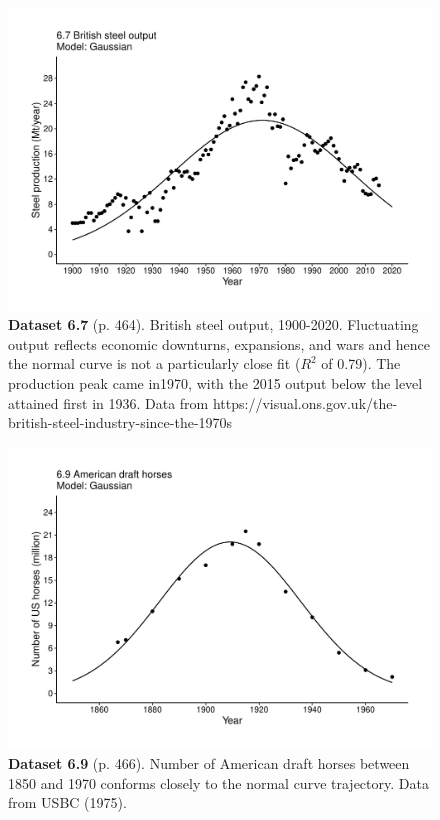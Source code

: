 \documentclass[aps,rmp,preprint,superscriptaddress,10pt,onecolumn]{article}
\begin{document}
\clearpage
\begin{figure}[h]
\includegraphics[width=\textwidth]{output/figs-ggplot/6.7.pdf}
\caption*{\textbf{Dataset 6.7} (p. 464). British steel output, 1900-2020. Fluctuating output reflects economic downturns, expansions, and wars and hence the normal curve is not a particularly close fit ($R^2$ of 0.79). The production peak came in1970, with the 2015 output below the level attained first in 1936. Data from https://visual.ons.gov.uk/the-british-steel-industry-since-the-1970s}
\end{figure}
	
\clearpage
\begin{figure}[h]
\includegraphics[width=\textwidth]{output/figs-ggplot/6.9.pdf}
\caption*{\textbf{Dataset 6.9} (p. 466). Number of American draft horses between 1850 and 1970 conforms closely to the normal curve trajectory. Data from USBC (1975). }
\end{figure}
	
\end{document}
